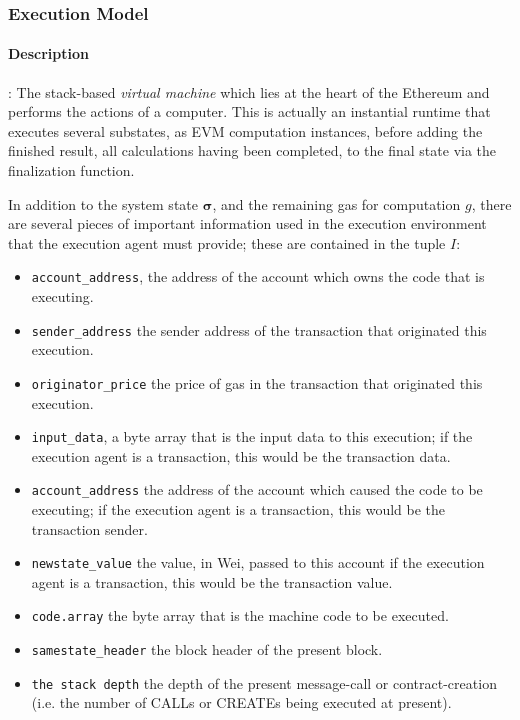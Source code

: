 \documentclass[10pt,a4paper,leqno,bibliography=totoc]{scrartcl}
\newenvironment{alphafootnotes}
{\par\edef\savedfootnotenumber{\number\value{footnote}}
\renewcommand{\thefootnote}{\alph{footnote}}
\setcounter{footnote}{0}}
{\par\setcounter{footnote}{\savedfootnotenumber}}
\begin{document}
\begin{alphafootnotes}
\begin{multicols*}{2}
	
			\subsubsection{Execution Model}
				\paragraph{Description}: The stack-based \textsl{virtual machine} which lies at the heart of the Ethereum and performs the actions of a computer. This is actually an instantial runtime that executes several substates, as EVM computation instances, before adding the finished result, all calculations having been completed, to the final state  via the finalization function.  
	
				In addition to the system state $\boldsymbol{\sigma}$, and the remaining gas for computation $g$, there are several pieces of important information used in the execution environment that the execution agent must provide; these are contained in the tuple $I$:

				\begin{itemize}
					\item \texttt{account\_address}, the address of the account which owns the code that is executing.
					\item \texttt{sender\_address} the sender address of the transaction that originated this execution.
					\item \texttt{originator\_price} the price of gas in the transaction that originated this execution.
					\item \texttt{input\_data}, a byte array that is the input data to this execution; if the execution agent is a transaction, this would be the transaction data.
					\item \texttt{account\_address}  the address of the account which caused the code to be executing; if the execution agent is a transaction, this would be the transaction sender.
					\item \texttt{newstate\_value} the value, in Wei, passed to this account if the execution agent is a transaction, this would be the transaction value.\supercite{Wood2017}
					\item \texttt{code.array} the byte array that is the machine code to be executed.\supercite{Wood2017}
					\item \texttt{samestate\_header} the block header of the present block.
					\item \texttt{the stack depth} the depth of the present message-call or contract-creation (i.e. the number of {\small CALL}s or {\small CREATE}s being executed at present).\supercite{Wood2017}
				\end{itemize}

\end{multicols*}
\end{alphafootnotes}
\end{document}
